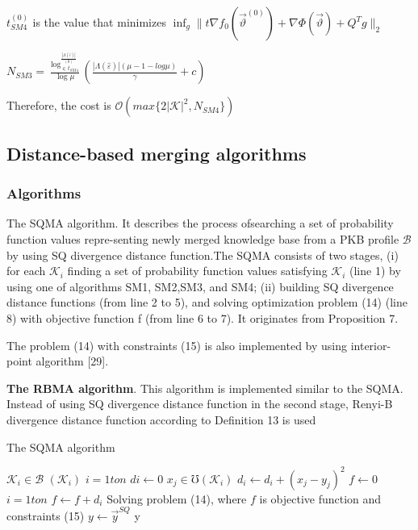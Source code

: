 \documentclass[]{iosart2c}
\begin{document}
$t^{(0)}_{SM4}$ is the value that minimizes
$\inf_g \parallel t\nabla f_0 \left( \vec{\vartheta}^(0) \right) + \nabla \Phi \left( \vec{\vartheta} \right) + Q^T g \parallel_2$

$N_{SM3} = \frac{\log^{\frac{|\Lambda(\hat{\varepsilon})|}{(0)}}_{\in t_{SM4}}}{\log\mu} \left( \frac{ |\Lambda(\hat{\varepsilon})| (\mu - 1 - log\mu)}{\gamma} + c\right)$

Therefore, the cost is $\mathcal{O}(max\{2 |\mathcal{K}|^2 ,N_{SM4}\})$

\subsection{Distance-based merging algorithms}

\subsubsection{Algorithms}

The SQMA algorithm. It describes the process ofsearching a set of probability function values repre-senting newly merged knowledge base from a PKB 
profile $\mathcal{B}$ by using SQ divergence distance function.The SQMA consists of two stages, (i) for each $\mathcal{K}_i$
finding a set of probability function values satisfying $\mathcal{K}_i$ (line 1) by using one of algorithms SM1, SM2,SM3, and SM4; (ii) building SQ divergence distance
functions (from line 2 to 5), and solving optimization problem (14) (line 8) with objective function f (from line 6 to 7). It originates from Proposition 7.

The problem (14) with constraints (15) is also
implemented by using interior-point algorithm [29].

\textbf{The RBMA algorithm}. This algorithm is implemented
similar to the SQMA. Instead of using SQ
divergence distance function in the second stage,
Renyi-B divergence distance function according to
Definition 13 is used

\begin{algorithm}
\caption{The SQMA algorithm}
\begin{algorithmic}[1]
\For $\mathcal{K}_i \in \mathcal{B}$
  \State $(\mathcal{K}_i )$
\EndFor
\For $i=1 to n$
  \State $di \gets 0$
  \For $x_j \in \mho(\mathcal{K}_i)$
    \State $d_i \gets d_i + (x_j - y_j)^2$
  \EndFor
\EndFor
\State $f \gets 0$
\For $i=1 to n$
  \State $f \gets f + d_i$
\EndFor
\State Solving problem (14), where $f$ is objective function and
constraints (15)
\State $y \gets \vec{y}^{SQ}$
\State \Return y
\end{algorithmic}
\end{algorithm}
\end{document}
